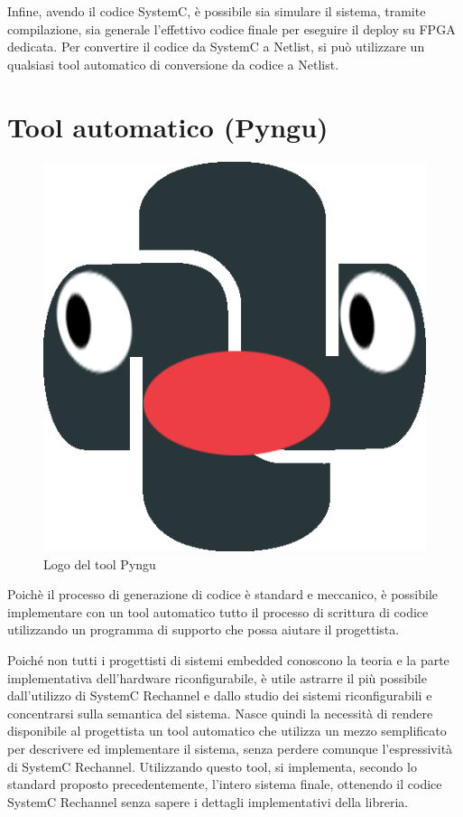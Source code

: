 \documentclass[a4paper,titlepage]{book}
\begin{document}
Infine, avendo il codice SystemC, è possibile sia simulare il sistema, tramite compilazione, sia generale l'effettivo codice finale per eseguire il deploy su FPGA dedicata. Per convertire il codice da SystemC a Netlist, si può utilizzare un qualsiasi tool automatico di conversione da codice a Netlist.

\section{Tool automatico (Pyngu)}


\begin{figure}[!ht]
\centering
\includegraphics[scale=0.2]{pyngulogo.png}
\caption{Logo del tool Pyngu}\label{fig:9}
\end{figure}


Poichè il processo di generazione di codice è standard e meccanico, è possibile implementare con un tool automatico tutto il processo di scrittura di codice utilizzando un programma di supporto che possa aiutare il progettista. 

Poiché non tutti i progettisti di sistemi embedded conoscono la teoria e la parte implementativa dell'hardware riconfigurabile, è utile astrarre il più possibile dall'utilizzo di SystemC Rechannel e dallo studio dei sistemi riconfigurabili e concentrarsi sulla semantica del sistema. Nasce quindi la necessità di rendere disponibile al progettista un tool automatico che utilizza un mezzo semplificato per descrivere ed implementare il sistema, senza perdere comunque l'espressività di SystemC Rechannel. Utilizzando questo tool, si implementa, secondo lo standard proposto precedentemente, l'intero sistema finale, ottenendo il codice SystemC Rechannel senza sapere i dettagli implementativi della libreria.
\end{document}

